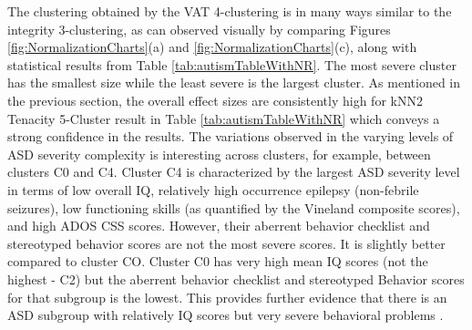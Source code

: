 \documentclass{bmcart}
\begin{document}
The clustering obtained by the VAT 4-clustering is in many ways similar to the integrity 3-clustering, as can observed visually by comparing Figures \ref{fig:NormalizationCharts}(a) and \ref{fig:NormalizationCharts}(c), along with statistical results from Table \ref{tab:autismTableWithNR}. The most severe cluster has the smallest size while the least severe is the largest cluster. 
As mentioned in the previous section, the overall effect sizes are consistently high for  kNN2 Tenacity 5-Cluster result in Table \ref{tab:autismTableWithNR} which conveys a strong confidence in the results. The variations observed in the varying levels of ASD severity complexity is interesting across clusters, for example, between clusters C0 and C4. Cluster C4 is characterized by the largest ASD severity level in terms of low overall IQ, relatively high occurrence epilepsy (non-febrile seizures), low functioning skills (as quantified by the Vineland composite scores), and high ADOS CSS scores. However, their aberrent behavior checklist and stereotyped behavior scores are not the most severe scores. It is slightly better compared to cluster CO. Cluster C0 has very high mean IQ scores (not the highest - C2) but the aberrent behavior checklist and stereotyped Behavior scores for that subgroup is the lowest. This provides further evidence that there is an ASD subgroup with relatively IQ scores but very severe behavioral problems \cite{obafemi2015sorting}. 
\end{document}
